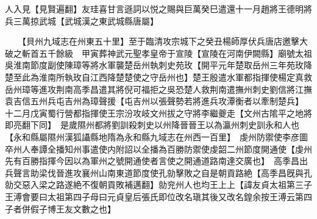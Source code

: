 人入見【見賢遍翻】友珪喜甘言遜詞以悦之賜與巨萬癸巳遣還十一月趙將王德明將兵三萬掠武城【武城漢之東武城縣唐屬】

　　【貝州九域志在州東五十里】至于臨清攻宗城下之癸丑楊師厚伏兵唐店邀擊大破之斬首五千餘級　甲寅葬神武元聖孝皇帝于宣陵【宣陵在河南伊闕縣】廟號太祖　吳淮南節度副使陳璋等將水軍襲楚岳州執刺史苑玫【開平元年楚取岳州三年苑玫降楚至此為淮南所執玫自江西降楚楚使之守岳州也】楚王殷遣水軍都指揮使楊定真救岳州璋等進攻荆南高季昌遣其將倪可福拒之吳恐楚人救荆南遣撫州刺史劉信將江撫袁吉信五州兵屯吉州為璋聲援【屯吉州以張聲勢若將進兵攻潭衡者以牽制楚兵】　十二月戊寅蜀行營都指揮使王宗汾攻岐文州拔之守將李繼夔走【文州古隂平之地將即亮翻下同】　是歲隰州都將劉訓殺刺史以州降晉晉王以為瀛州刺史訓永和人也【永和縣屬隰州漢狐讘縣地隋為永和縣九域志在州西一百里】　虔州防禦使李彦圖卒州人奉譚全播知州事遣使内附詔以全播為百勝防禦使虔韶二州節度開通使【虔州先有百勝指揮今因以為軍州之號開通使者言使之開通道路南達交廣也】　高季昌出兵聲言助梁伐晉進攻襄州山南東道節度使孔勍擊敗之自是朝貢路絶【高季昌旣與孔勍交惡入梁之路遂絶不復朝貢敗補邁翻】勍兖州人也均王上上【諱友貞太祖第三子王溥會要曰太祖第四子母曰元貞皇后張氏即位改名瑱其後又改名鍠余按王溥云第四子者併假子博王友文數之也】

